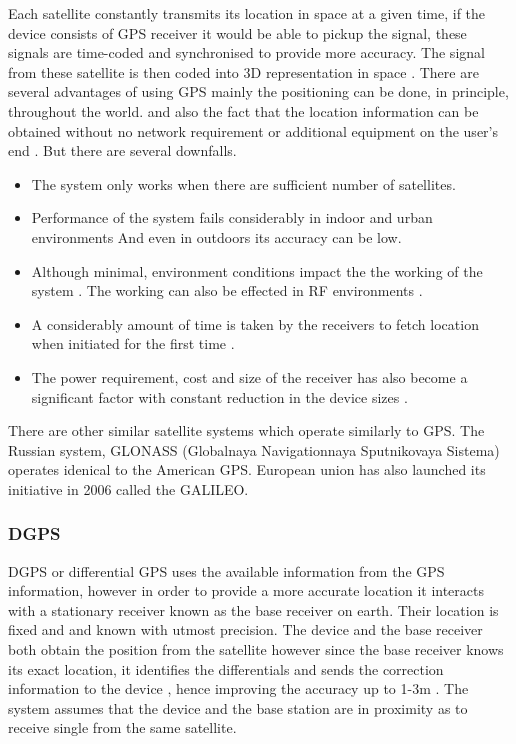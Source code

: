 \documentclass[12pt]{report}
\begin{document}
Each satellite constantly transmits its location in space at a given time, if the device consists of GPS receiver 
it would be able to pickup the signal, these signals are time-coded and synchronised to provide more accuracy. The signal from these satellite is then coded into 3D representation in space  \cite{djuknic2001geolocation}.  There are several advantages of using GPS mainly the positioning can be done, in principle, throughout the world. and also the fact that the location information can be obtained without no network requirement or additional equipment on the user's end  \cite{djuknic2001geolocation}. But there are several downfalls.


\begin{itemize}
\item The system only works when there are sufficient number of satellites.

\item Performance of the system fails considerably in indoor and urban environments \cite{hazas2004location} And even in outdoors its accuracy can be low.

\item Although minimal, environment conditions impact the the working of the system \cite{schiller2004location}. The working can also be effected in RF environments \cite{djuknic2001geolocation}.

\item A considerably amount of time is taken by the receivers to fetch location when initiated for the first time \cite{hazas2004location}.

\item The power requirement, cost and size of the receiver has also become a significant factor with constant reduction in the device sizes \cite{djuknic2001geolocation}.
\end{itemize}

There are other similar satellite systems which operate similarly to GPS. The Russian system, GLONASS (Globalnaya Navigationnaya Sputnikovaya Sistema) operates idenical to the American GPS. European union has also launched its initiative in 2006 called the GALILEO.


\subsubsection{DGPS}
DGPS or differential GPS uses the available information from the GPS information, however in order to provide a more accurate location it interacts with a stationary receiver known as the base receiver on earth. Their location is fixed and and known with utmost precision. The device and the base receiver both obtain the position from the satellite  however since the base receiver knows its exact location, it identifies the differentials and sends the correction information to the device \cite{roth2002mobile}, hence improving the accuracy up to 1-3m \cite{schiller2004location}. The system assumes that the device and the base station are in proximity as to receive single from the same satellite. 
\end{document}
